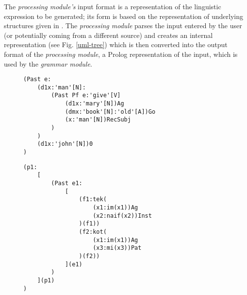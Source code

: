 \documentclass[a4paper, halfparskip, onecolumn, abstracton, final, figurecaptionabove]{scrartcl}
\begin{document}
The \emph{processing module's} input format is a representation of the linguistic expression to be generated; its form is based on the representation of underlying structures given in \cite{Dik1997a}. The \emph{processing module} parses the input entered by the user (or potentially coming from a different source) and creates an internal representation (see Fig. \ref{uml-tree}) which is then converted into the output format of the \emph{processing module}, a Prolog representation of the input, which is used by the \emph{grammar module}.

\begin{figure}
    \begin{center}

\begin{verbatim}
(Past e:
    (d1x:'man'[N]:
        (Past Pf e:'give'[V]
            (d1x:'mary'[N])Ag  
            (dmx:'book'[N]:'old'[A])Go
            (x:'man'[N])RecSubj
        )
    )
    (d1x:'john'[N])0
)
\end{verbatim}


\label{antlr-input}

    \end{center}
    \end{figure}
    
    \begin{figure}
     \begin{center}
  
\begin{verbatim}
(p1: 
    [ 
        (Past e1: 
            [
                (f1:tek(
                    (x1:im(x1))Ag
                    (x2:naif(x2))Inst
                )(f1))
                (f2:kot(
                    (x1:im(x1))Ag
                    (x3:mi(x3))Pat
                )(f2))
            ](e1)
        )
    ](p1)
)
\end{verbatim}


\label{fdg-rl}  
\end{center}
\end{figure}
\end{document}
